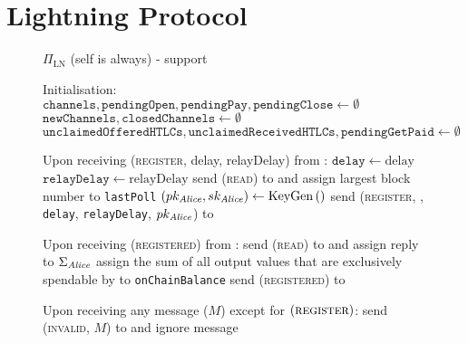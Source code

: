 \section{Lightning Protocol}
  \begin{figure}[H] %
    \begin{protocolbox}{$\Pi_{\mathrm{LN}}$ (self is \alice{} always) - support}
      \begin{algorithmic}[1]
        \State Initialisation:
        \Indent
          \State $\mathtt{channels}, \mathtt{pendingOpen}, \mathtt{pendingPay},
          \mathtt{pendingClose} \gets \emptyset$
          \State $\mathtt{newChannels}, \mathtt{closedChannels} \gets \emptyset$
          \State $\mathtt{unclaimedOfferedHTLCs},
          \mathtt{unclaimedReceivedHTLCs}, \mathtt{pendingGetPaid} \gets
          \emptyset$
        \EndIndent
        \Statex

        \State Upon receiving (\textsc{register}, delay, relayDelay) from
        \environment:
        \Indent
          \State $\mathtt{delay} \gets \mathrm{delay}$ 
          \label{alg:protocol:support:delay}
          \State $\mathtt{relayDelay} \gets \mathrm{relayDelay}$
          \State send (\textsc{read}) to \ledger{} and assign largest block
          number to \texttt{lastPoll}
          \label{alg:protocol:support:lastpoll}
          \State $\left(pk_{\mathit{Alice}}, sk_{\mathit{Alice}}\right) \gets
          \mathrm{KeyGen}\left(\right)$
          \label{alg:protocol:support:keygen}
          \State send (\textsc{register}, \alice, \texttt{delay},
          \texttt{relayDelay}, $pk_{\mathit{Alice}}$) to \environment
        \EndIndent
        \Statex

        \State Upon receiving (\textsc{registered}) from \environment:
        \Indent
          \State send (\textsc{read}) to \ledger{} and assign reply to
          $\Sigma_{\mathit{Alice}}$
          \State assign the sum of all output values that are exclusively
          spendable by \alice{} to \texttt{onChainBalance}
          \State send (\textsc{registered}) to \environment
        \EndIndent
        \Statex

        \State Upon receiving any message ($M$) except for
        $\left(\textsc{register}\right)$:
        \Indent
            \State send (\textsc{invalid}, $M$) to \environment{} and ignore
            message
          \EndIf
        \EndIndent
        \Statex


\end{algorithmic}
\end{protocolbox}
\end{figure}
